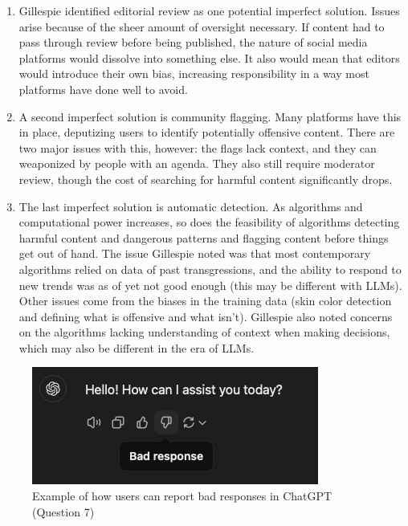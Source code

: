 \documentclass{article}
\begin{document}
\bigskip

\begin{mdframed}

\begin{enumerate}
    \item Gillespie identified editorial review as one potential imperfect solution. Issues arise because of the sheer amount of oversight necessary. If content had to pass through review before being published, the nature of social media platforms would dissolve into something else. It also would mean that editors would introduce their own bias, increasing responsibility in a way most platforms have done well to avoid.
    \item A second imperfect solution is community flagging. Many platforms have this in place, deputizing users to identify potentially offensive content. There are two major issues with this, however: the flags lack context, and they can weaponized by people with an agenda. They also still require moderator review, though the cost of searching for harmful content significantly drops.
    \item The last imperfect solution is automatic detection. As algorithms and computational power increases, so does the feasibility of algorithms  detecting harmful content and dangerous patterns and flagging content before things get out of hand. The issue Gillespie noted was that most contemporary algorithms relied on data of past transgressions, and the ability to respond to new trends was as of yet not good enough (this may be different with LLMs). Other issues come from the biases in the training data (skin color detection and defining what is offensive and what isn't). Gillespie also noted concerns on the algorithms lacking understanding of context when making decisions, which may also be different in the era of LLMs.
\end{enumerate}
\end{mdframed}


\bigskip

\begin{figure}[h!]
\centering
\includegraphics[width=0.3\linewidth]{problem2_example.png}
\caption{Example of how users can report bad responses in ChatGPT (Question 7)}
\label{fig:p2_q7}
\end{figure}
\end{document}
